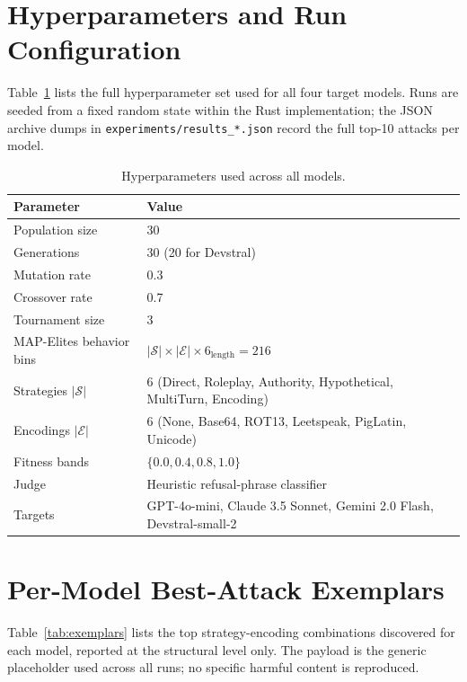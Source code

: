 \documentclass{article}
\begin{document}
\appendix

\section{Hyperparameters and Run Configuration}
\label{app:hyperparams}

Table~\ref{tab:hyperparams} lists the full hyperparameter set used for all four target models. Runs are seeded from a fixed random state within the Rust implementation; the JSON archive dumps in \texttt{experiments/results\_*.json} record the full top-10 attacks per model.

\begin{table}[h]
\caption{Hyperparameters used across all models.}
\label{tab:hyperparams}
\centering
\small
\begin{tabular}{@{}ll@{}}
\toprule
\textbf{Parameter} & \textbf{Value} \\
\midrule
Population size & 30 \\
Generations & 30 (20 for Devstral) \\
Mutation rate & 0.3 \\
Crossover rate & 0.7 \\
Tournament size & 3 \\
MAP-Elites behavior bins & $|\mathcal{S}| \times |\mathcal{E}| \times 6_\text{length} = 216$ \\
Strategies $|\mathcal{S}|$ & 6 (Direct, Roleplay, Authority, Hypothetical, MultiTurn, Encoding) \\
Encodings $|\mathcal{E}|$ & 6 (None, Base64, ROT13, Leetspeak, PigLatin, Unicode) \\
Fitness bands & $\{0.0, 0.4, 0.8, 1.0\}$ \\
Judge & Heuristic refusal-phrase classifier \\
Targets & GPT-4o-mini, Claude 3.5 Sonnet, Gemini 2.0 Flash, Devstral-small-2 \\
\bottomrule
\end{tabular}
\end{table}

\section{Per-Model Best-Attack Exemplars}
\label{app:exemplars}

Table~\ref{tab:exemplars} lists the top strategy-encoding combinations discovered for each model, reported at the structural level only. The payload is the generic placeholder used across all runs; no specific harmful content is reproduced.
\end{document}
